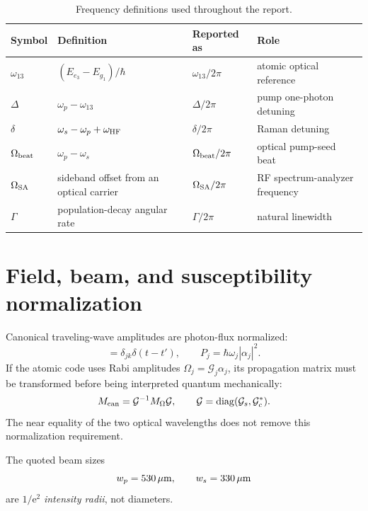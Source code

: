 \documentclass[11pt,a4paper]{article}
\newcommand{\e}{\mathrm e}
\begin{document}
\begin{table}[ht]
\centering
\caption{Frequency definitions used throughout the report.}
\label{tab:frequency-definitions}
\small
\begin{tabularx}{\textwidth}{L{2.5cm}L{4.2cm}L{3.3cm}Y}
\toprule
Symbol & Definition & Reported as & Role\\
\midrule
$\omega_{13}$ & $(E_{e_3}-E_{g_1})/\hbar$ &
$\omega_{13}/2\pi$ & atomic optical reference\\
$\Delta$ & $\omega_p-\omega_{13}$ &
$\Delta/2\pi$ & pump one-photon detuning\\
$\delta$ & $\omega_s-\omega_p+\omega_{\rm HF}$ &
$\delta/2\pi$ & Raman detuning\\
$\Omega_{\rm beat}$ & $\omega_p-\omega_s$ &
$\Omega_{\rm beat}/2\pi$ & optical pump-seed beat\\
$\Omega_{\rm SA}$ & sideband offset from an optical carrier &
$\Omega_{\rm SA}/2\pi$ & RF spectrum-analyzer frequency\\
$\Gamma$ & population-decay angular rate &
$\Gamma/2\pi$ & natural linewidth\\
\bottomrule
\end{tabularx}
\end{table}

\section{Field, beam, and susceptibility normalization}

Canonical traveling-wave amplitudes are photon-flux normalized:
\begin{equation}
[\delta\hat a_j(z,t),\delta\hat a_k^\dagger(z,t')]
=\delta_{jk}\delta(t-t'),\qquad
P_j=\hbar\omega_j|\alpha_j|^2 .
\label{eq:flux-normalization}
\end{equation}
If the atomic code uses Rabi amplitudes
$\Omega_j=\mathcal G_j\alpha_j$, its propagation matrix must be transformed
before being interpreted quantum mechanically:
\begin{equation}
M_{\rm can}=\mathcal G^{-1}M_{\Omega}\mathcal G,\qquad
\mathcal G=\operatorname{diag}(\mathcal G_s,\mathcal G_c^*).
\label{eq:canonical-rescaling}
\end{equation}
The near equality of the two optical wavelengths does not remove this
normalization requirement.

The quoted beam sizes
\[
w_p=530\,\mu{\rm m},\qquad w_s=330\,\mu{\rm m}
\]
are $1/\e^2$ \emph{intensity radii}, not diameters.
\end{document}
